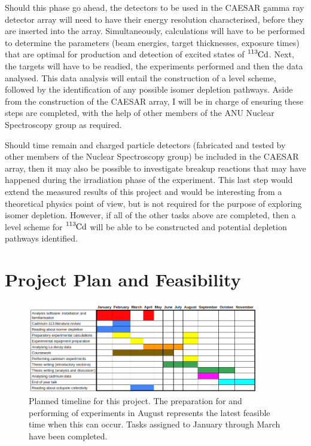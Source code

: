 \documentclass[12pt,a4paper]{article}
\begin{document}
\medskip
\noindent
Should this phase go ahead, the detectors to be used in the CAESAR gamma ray detector array will need to have their energy resolution characterised, before they are inserted into the array.
Simultaneously, calculations will have to be performed to determine the parameters (beam energies, target thicknesses, exposure times) that are optimal for production and detection of excited states of $\ce{^{113}Cd}$.
Next, the targets will have to be readied, the experiments performed and then the data analysed. 
This data analysis will entail the construction of a level scheme, followed by the identification of any possible isomer depletion pathways.
Aside from the construction of the CAESAR array, I will be in charge of ensuring these steps are completed, with the help of other members of the ANU Nuclear Spectroscopy group as required.

\medskip
\noindent
Should time remain and charged particle detectors (fabricated and tested by other members of the Nuclear Spectroscopy group) be included in the CAESAR array, then it may also be possible to investigate breakup reactions that may have happened during the irradiation phase of the experiment.
This last step would extend the measured results of this project and would be interesting from a theoretical physics point of view, but is not required for the purpose of exploring isomer depletion.
However, if all of the other tasks above are completed, then a level scheme for $\ce{^{113}Cd}$ will be able to be constructed and potential depletion pathways identified. 


\section*{Project Plan and Feasibility}
\begin{figure}[htbp]
	\centering
	\includegraphics[width=0.9\textwidth]{GanttRP}
	\caption{Planned timeline for this project. The preparation for and performing of experiments in August represents the latest feasible time when this can occur. Tasks assigned to January through March have been completed.}
\label{fig:gantt}
\end{figure}
\end{document}
